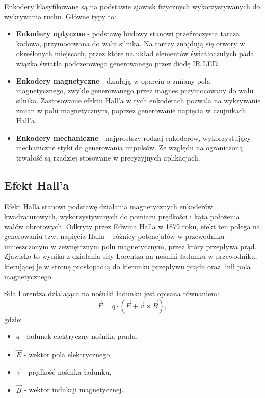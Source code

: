 Enkodery klasyfikowane są na podstawie zjawisk fizycznych wykorzystywanych do wykrywania ruchu. Główne typy to\cite{bib:enkoder-mag-opt}:

\begin{itemize}
    \item \textbf{Enkodery optyczne} - podstawę budowy stanowi przeźroczysta tarcza kodowa, przymocowana do wału silnika. Na tarczy znajdują się otwory w określonych miejscach, przez które na układ elementów światłoczułych pada wiązka światła podczerowego generowanego przez diodę IR LED. 
    \item \textbf{Enkodery magnetyczne} - działają w oparciu o zmiany pola magnetycznego, zwykle generowanego przez magnes przymocowany do wału silnika. Zastosowanie efektu Hall'a w tych enkoderach pozwala na wykrywanie zmian w polu magnetycznym, poprzez generowanie napięcia w czujnikach Hall'a.
    \item \textbf{Enkodery mechaniczne} - najprostszy rodzaj enkoderów, wykorzystujący mechaniczne styki do generowania impulsów. Ze względu na ograniczoną trwałość są rzadziej stosowane w precyzyjnych aplikacjach.
\end{itemize}


\subsection{Efekt Hall'a}

Efekt Halla \cite{bib:zjawisko-halla} stanowi podstawę działania magnetycznych enkoderów kwadraturowych, wykorzystywanych do pomiaru prędkości i kąta położenia wałów obrotowych. Odkryty przez Edwina Halla w 1879 roku, efekt ten polega na generowaniu tzw. napięcia Halla – różnicy potencjałów w przewodniku umieszczonym w zewnętrznym polu magnetycznym, przez który przepływa prąd. Zjawisko to wynika z działania siły Lorentza na nośniki ładunku w przewodniku, kierującej je w stronę prostopadłą do kierunku przepływu prądu oraz linii pola magnetycznego.

Siła Lorentza działająca na nośniki ładunku jest opisana równaniem:
\[
\vec{F} = q \cdot (\vec{E} + \vec{v} \times \vec{B}),
\]
gdzie:
\begin{itemize}
    \item \( q \) - ładunek elektryczny nośnika prądu,
    \item \( \vec{E} \) - wektor pola elektrycznego,
    \item \( \vec{v} \) - prędkość nośnika ładunku,
    \item \( \vec{B} \) - wektor indukcji magnetycznej.
\end{itemize}

